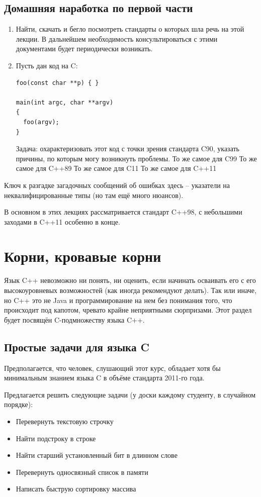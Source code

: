 \documentclass[a4paper,12pt,oneside]{article}
\begin{document}
\subsection{Домашняя наработка по первой части}
\begin{enumerate}
\item
Найти, скачать и бегло посмотреть стандарты о которых шла речь на этой лекции. В дальнейшем необходимость консультироваться с этими документами будет периодически возникать.
\item
Пусть дан код на C:
\begin{lstlisting}
foo(const char **p) { }

main(int argc, char **argv)
{
  foo(argv);
}
\end{lstlisting}
Задача: охарактеризовать этот код с точки зрения стандарта C90, указать причины, по которым могу возникнуть проблемы.
То же самое для C99
То же самое для C++89
То же самое для C11
То же самое для C++11
\end{enumerate}
Ключ к разгадке загадочных сообщений об ошибках здесь – указатели на неквалифицированные типы (но там ещё много нюансов).

В основном в этих лекциях рассматривается стандарт C++98, с небольшими заходами в C++11 особенно в конце.

\pagebreak
\section{Корни, кровавые корни}

Язык C++ невозможно ни понять, ни оценить, если начинать осваивать его с его высокоуровневых возможностей (как иногда рекомендуют делать). Так или иначе, но C++ это не Java и программирование на нем без понимания того, что происходит под капотом, чревато крайне неприятными сюрпризами. Этот раздел будет посвящён C-подмножеству языка C++.

\subsection{Простые задачи для языка C}

Предполагается, что человек, слушающий этот курс, обладает хотя бы минимальным знанием языка C в объёме стандарта 2011-го года.

Предлагается решить следующие задачи (у доски каждому студенту, в случайном порядке):

\begin{itemize}
\item
Перевернуть текстовую строчку
\item
Найти подстроку в строке
\item
Найти старший установленный бит в длинном слове
\item
Перевернуть односвязный список в памяти
\item
Написать быструю сортировку массива
\end{itemize}
\end{document}
